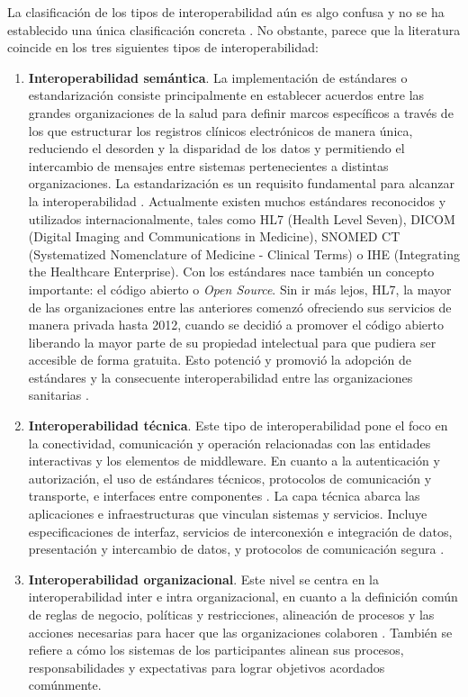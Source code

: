 La clasificación de los tipos de interoperabilidad aún es algo confusa y no se ha establecido una única clasificación concreta \cite{santos2021interoperability}. No obstante, parece que la literatura coincide en los tres siguientes tipos de interoperabilidad:

\begin{enumerate}[label=\alph*.]

    \item \textbf{Interoperabilidad semántica}. La implementación de estándares o estandarización consiste principalmente en establecer acuerdos entre las grandes organizaciones de la salud para definir marcos específicos a través de los que estructurar los registros clínicos electrónicos de manera única, reduciendo el desorden y la disparidad de los datos y permitiendo el intercambio de mensajes entre sistemas pertenecientes a distintas organizaciones. La estandarización es un requisito fundamental para alcanzar la interoperabilidad \cite{katehakis2019framework}. Actualmente existen muchos estándares reconocidos y utilizados internacionalmente, tales como HL7 (Health Level Seven), DICOM (Digital Imaging and Communications in Medicine), SNOMED CT (Systematized Nomenclature of Medicine - Clinical Terms) o IHE (Integrating the Healthcare Enterprise). Con los estándares nace también un concepto importante: el código abierto o \textit{Open Source}. Sin ir más lejos, HL7, la mayor de las organizaciones entre las anteriores comenzó ofreciendo sus servicios de manera privada hasta 2012, cuando se decidió a promover el código abierto liberando la mayor parte de su propiedad intelectual para que pudiera ser accesible de forma gratuita. Esto potenció y promovió la adopción de estándares y la consecuente interoperabilidad entre las organizaciones sanitarias \cite{berryman2013data}.

    \item \textbf{Interoperabilidad técnica}. Este tipo de interoperabilidad pone el foco en la conectividad, comunicación y operación relacionadas con las entidades interactivas y los elementos de middleware. En cuanto a la autenticación y autorización, el uso de estándares técnicos, protocolos de comunicación y transporte, e interfaces entre componentes \cite{santos2021interoperability}. La capa técnica abarca las aplicaciones e infraestructuras que vinculan sistemas y servicios. Incluye especificaciones de interfaz, servicios de interconexión e integración de datos, presentación y intercambio de datos, y protocolos de comunicación segura \cite{leal2019interoperability}.
    
    \item \textbf{Interoperabilidad organizacional}. Este nivel se centra en la interoperabilidad inter e intra organizacional, en cuanto a la definición común de reglas de negocio, políticas y restricciones, alineación de procesos y las acciones necesarias para hacer que las organizaciones colaboren \cite{motta2019conceptual}. También se refiere a cómo los sistemas de los participantes alinean sus procesos, responsabilidades y expectativas para lograr objetivos acordados comúnmente.

\end{enumerate}

